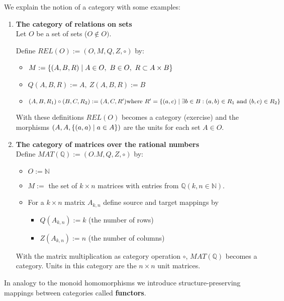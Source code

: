 We explain the notion of a category with some examples:
\begin{enumerate}
  \item {\bf The category of relations on sets} \\
  Let $O$ be a set of sets ($O \notin O)$. 
  
  Define $REL(O) := (O, M, Q, Z,\circ)$ by:
  \begin{itemize}
  	\item $M := \mbox{$\{(A,B,R) \mid A \in O,\ B \in O,\ R \subset A \times B\}$}$
  	\item $Q(A,B,R) := A, \ Z(A,B,R) := B$
  	\item $(A,B,R_1) \circ (B,C,R_2) := (A,C,R')\\
  	\text{where }R'= \mbox{$\{(a,c) \mid \exists b \in B: (a,b)\in R_1\text{ and
  	}(b,c)\in R_2\}$}$
  \end{itemize}
  With these definitions $REL(O)$ becomes a category (exercise) and the
  morphisms $(A, A, \mbox{$\{(a, a) \mid a\in A\}$})$ are the units for each set $A
  \in O$.

  \item {\bf The category of matrices over the rational numbers} \\
  Define $MAT(\mathbb{Q}) := (O. M, Q, Z, \circ)$ by:
  \begin{itemize}
    \item $O := \mathbb{N}$
    \item $M :=$ the set of $k \times n$ matrices with entries from
    $\mathbb{Q} (k, n \in \mathbb{N})$.
    \item For a $k \times n$ matrix $A_{k,n}$ define source and target mappings
    by
    \begin{itemize}
	    \item[] $Q(A_{k,n}) := k$ (the number of rows)
  	  \item[] $Z(A_{k,n}) := n$ (the number of columns)
    \end{itemize}
  \end{itemize}
	With the matrix multiplication as category operation $\circ$, $MAT(\mathbb{Q})$ 
	becomes a category. Units in this category are the $n\times n$ unit matrices.
\end{enumerate}

\bigskip
In analogy to the monoid homomorphisms we introduce structure-preserving
mappings between categories called {\bf functors}.

